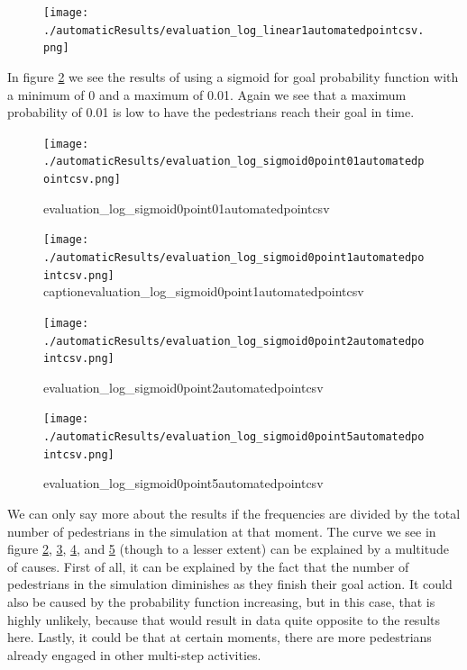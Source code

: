\documentclass[11pt]{book}
\begin{document}
\begin{figure}
\centering
\texttt{[image: ./automaticResults/evaluation\_log\_linear1automatedpointcsv.png]}
\label{evaluation_log_linear1automatedpointcsv}
\end{figure}



In figure \ref{evaluation_log_sigmoid0point01automatedpointcsv} we see the results of using a sigmoid for goal probability function with a minimum  of 0 and a maximum of 0.01. Again we see that a maximum probability of 0.01 is low to have the pedestrians reach their goal in time.

\begin{figure}
\centering
\texttt{[image: ./automaticResults/evaluation\_log\_sigmoid0point01automatedpointcsv.png]}
\caption{evaluation\_log\_sigmoid0point01automatedpointcsv}
\label{evaluation_log_sigmoid0point01automatedpointcsv}
\end{figure}



\begin{figure}
\centering
\texttt{[image: ./automaticResults/evaluation\_log\_sigmoid0point1automatedpointcsv.png]}
caption{evaluation\_log\_sigmoid0point1automatedpointcsv}
\label{evaluation_log_sigmoid0point1automatedpointcsv}
\end{figure}

\begin{figure}
\centering
\texttt{[image: ./automaticResults/evaluation\_log\_sigmoid0point2automatedpointcsv.png]}
\caption{evaluation\_log\_sigmoid0point2automatedpointcsv}
\label{evaluation_log_sigmoid0point2automatedpointcsv}
\end{figure}

\begin{figure}
\centering
\texttt{[image: ./automaticResults/evaluation\_log\_sigmoid0point5automatedpointcsv.png]}
\caption{evaluation\_log\_sigmoid0point5automatedpointcsv}
\label{evaluation_log_sigmoid0point5automatedpointcsv}
\end{figure}

We can only say more about the results if the frequencies are divided by the total number of pedestrians in the simulation at that moment. The curve we see in figure \ref{evaluation_log_sigmoid0point01automatedpointcsv}, \ref{evaluation_log_sigmoid0point1automatedpointcsv}, \ref{evaluation_log_sigmoid0point2automatedpointcsv}, and \ref{evaluation_log_sigmoid0point5automatedpointcsv} (though to a lesser extent) can be explained by a multitude of causes. First of all, it can be explained by the fact that the number of pedestrians in the simulation diminishes as they finish their goal action. It could also be caused by the probability function increasing, but in this case, that is highly unlikely, because that would result in data quite opposite to the results here. Lastly, it could be that at certain moments, there are more pedestrians already engaged in other multi-step activities.
\end{document}

